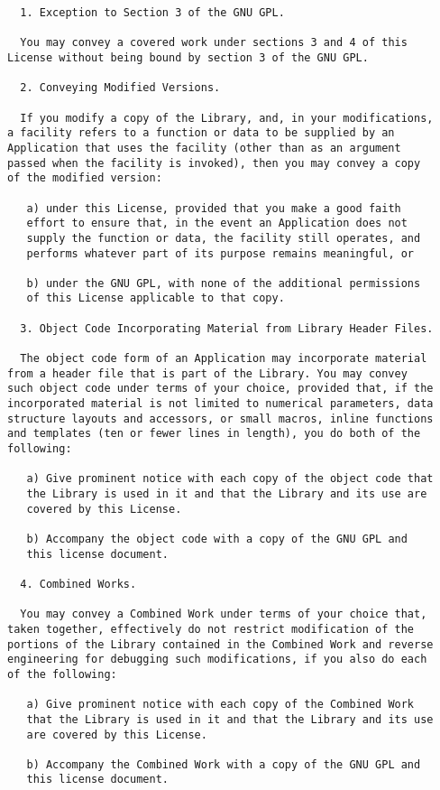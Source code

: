\documentclass[11pt,twoside,fleqn,openright,titlepage]{cslreport}
\begin{document}
\begin{small}
\begin{verbatim}
  1. Exception to Section 3 of the GNU GPL.

  You may convey a covered work under sections 3 and 4 of this
License without being bound by section 3 of the GNU GPL.

  2. Conveying Modified Versions.

  If you modify a copy of the Library, and, in your modifications,
a facility refers to a function or data to be supplied by an
Application that uses the facility (other than as an argument
passed when the facility is invoked), then you may convey a copy
of the modified version:

   a) under this License, provided that you make a good faith
   effort to ensure that, in the event an Application does not
   supply the function or data, the facility still operates, and
   performs whatever part of its purpose remains meaningful, or

   b) under the GNU GPL, with none of the additional permissions
   of this License applicable to that copy.

  3. Object Code Incorporating Material from Library Header Files.

  The object code form of an Application may incorporate material
from a header file that is part of the Library. You may convey
such object code under terms of your choice, provided that, if the
incorporated material is not limited to numerical parameters, data
structure layouts and accessors, or small macros, inline functions
and templates (ten or fewer lines in length), you do both of the
following:

   a) Give prominent notice with each copy of the object code that
   the Library is used in it and that the Library and its use are
   covered by this License.

   b) Accompany the object code with a copy of the GNU GPL and
   this license document.

  4. Combined Works.

  You may convey a Combined Work under terms of your choice that,
taken together, effectively do not restrict modification of the
portions of the Library contained in the Combined Work and reverse
engineering for debugging such modifications, if you also do each
of the following:

   a) Give prominent notice with each copy of the Combined Work
   that the Library is used in it and that the Library and its use
   are covered by this License.

   b) Accompany the Combined Work with a copy of the GNU GPL and
   this license document.


\end{verbatim}
\end{small}
\end{document}
